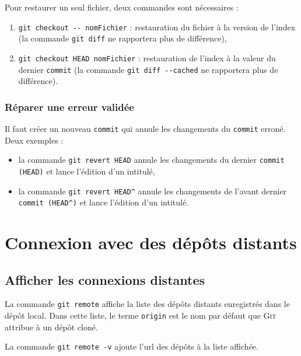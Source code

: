 \documentclass[11pt,twoside,headings=normal,open=right,french,DIV=12]{scrreprt}
\newcommand{\git}{\textsc{Git}}
\newcommand{\spec}[1]{\texttt{#1}}
\begin{document}
    \smallskip

Pour restaurer un seul fichier, deux commandes sont nécessaires :
\begin{enumerate}
\item \verb|git checkout -- nomFichier| : restauration du fichier à la version de l'index (la commande \verb|git diff| ne rapportera plus de différence),
\item \verb|git checkout HEAD nomFichier| : restauration de l'index à la valeur du dernier \verb|commit| (la commande \verb|git diff --cached| ne rapportera plus de différence).
\end{enumerate}



\subsubsection{Réparer une erreur validée}



Il faut créer un nouveau \verb|commit| qui annule les changements du \verb|commit| erroné. Deux  exemples :
\begin{itemize}
\item la commande \verb|git revert HEAD| annule les changements du dernier \verb|commit (HEAD)| et lance l'édition d'un intitulé,
\item la commande \verb|git revert HEAD^| annule les changements de l'avant dernier \verb|commit (HEAD^)| et lance l'édition d'un intitulé.
\end{itemize}



\section{Connexion avec des dépôts distants}    



\subsection{Afficher les connexions distantes}    



    La commande \verb|git remote| affiche la liste des dépôts distants enregistrés dans le dépôt local. Dans cette liste, le terme \spec{origin} est le nom par défaut que \git{} attribue à un dépôt cloné.
    
    \smallskip
    
    La commande \verb|git remote -v| ajoute l'url des dépôts à la liste affichée.
\end{document}
